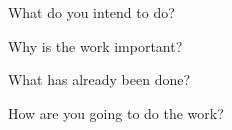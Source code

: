 What do you intend to do?

Why is the work important? 

What has already been done? 

How are you going to do the work?


